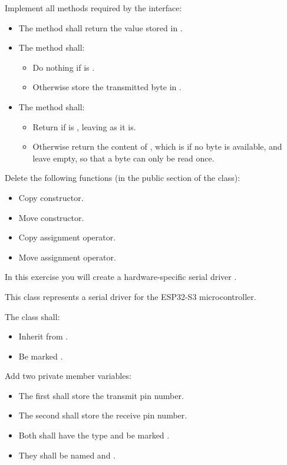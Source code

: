 Implement all methods required by the interface:
\begin{itemize}
  \item The method  shall return the value stored in .
  \item The method  shall:
  \begin{itemize}
    \item Do nothing if  is .
    \item Otherwise store the transmitted byte in .
  \end{itemize}
  \item The method  shall:
  \begin{itemize}
    \item Return  if  is , leaving
       as it is.
    \item Otherwise return the content of , which is  if no
      byte is available, and leave  empty, so that a byte can only be read once.
  \end{itemize}
\end{itemize}

Delete the following functions (in the public section of the class):
\begin{itemize}
  \item Copy constructor.
  \item Move constructor.
  \item Copy assignment operator.
  \item Move assignment operator.
\end{itemize}

\label{c4:ex:1.3}
In this exercise you will create a hardware-specific serial driver .

This class represents a serial driver for the ESP32-S3 microcontroller.

The class shall:
\begin{itemize}
  \item Inherit from .
  \item Be marked .
\end{itemize}

Add two private member variables:
\begin{itemize}
  \item The first shall store the transmit pin number.
  \item The second shall store the receive pin number.
  \item Both shall have the type  and be marked .
  \item They shall be named  and .
\end{itemize}

